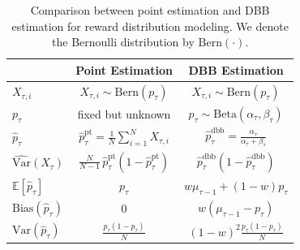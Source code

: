 \begin{table}[htbp]
\centering
\renewcommand{\arraystretch}{2.0}   
\setlength{\tabcolsep}{4pt}         

\caption{Comparison between point estimation and DBB estimation for reward distribution modeling. We denote the Bernoulli distribution by $\mathrm{Bern}(\cdot)$.}
\label{tab:estimator_comparison}
\begin{tabular}{l|c|c}
\toprule
 & {\small\textbf{Point Estimation}} & {\small\textbf{DBB Estimation}} \\
\midrule

$X_{\tau,i}$
& $X_{\tau,i} \sim \mathrm{Bern}(p_\tau)$
& $X_{\tau,i} \sim \mathrm{Bern}(p_\tau)$ \\


$p_\tau$
& fixed but unknown
& $p_\tau \sim \mathrm{Beta}(\alpha_\tau,\beta_\tau)$ \\

$\hat{p}_\tau$
& $\displaystyle \hat{p}_\tau^{\mathrm{pt}} = \frac{1}{N}\sum_{i=1}^N X_{\tau,i}$
& $\displaystyle \hat{p}_\tau^{\mathrm{dbb}} = \frac{\alpha_\tau}{\alpha_\tau+\beta_\tau}$ \\

$\widehat{\mathrm{Var}}(X_\tau)$
& $\displaystyle \frac{N}{N-1}\,\hat{p}_\tau^{\mathrm{pt}}\!\left(1-\hat{p}_\tau^{\mathrm{pt}}\right)$
& $\displaystyle \hat{p}_\tau^{\mathrm{dbb}}\!\left(1-\hat{p}_\tau^{\mathrm{dbb}}\right)$ \\


$\mathbb{E}[\hat{p}_\tau]$
& $p_\tau$
& $w\mu_{\tau-1} + (1-w)p_\tau$ \\

$\mathrm{Bias}(\hat{p}_\tau)$
& $0$
& $w(\mu_{\tau-1} - p_\tau)$ \\

$\mathrm{Var}(\hat{p}_\tau)$
& $\displaystyle \frac{p_\tau(1-p_\tau)}{N}$
& $\displaystyle (1-w)^2\frac{p_\tau(1-p_\tau)}{N}$ \\

\bottomrule
\end{tabular}
\end{table}
